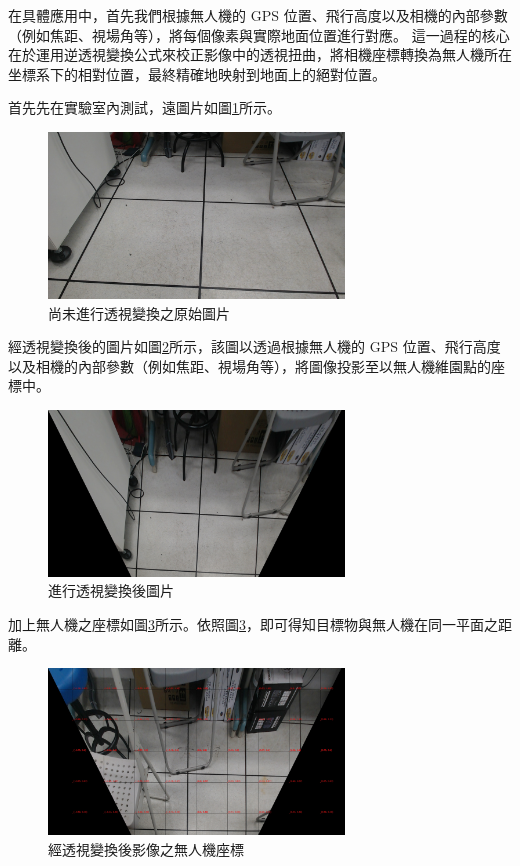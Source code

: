 \documentclass[12pt]{article}       %
\begin{document}
在具體應用中，首先我們根據無人機的 GPS 位置、飛行高度以及相機的內部參數（例如焦距、視場角等），將每個像素與實際地面位置進行對應。
這一過程的核心在於運用逆透視變換公式來校正影像中的透視扭曲，將相機座標轉換為無人機所在坐標系下的相對位置，最終精確地映射到地面上的絕對位置。

首先先在實驗室內測試，遠圖片如圖\ref{fig:11}所示。
\begin{figure}[H]
    \centering
    \includegraphics[width=0.7\textwidth]{11.jpg}     %
    \caption{尚未進行透視變換之原始圖片}    %
    \label{fig:11}    %
\end{figure}
經透視變換後的圖片如圖\ref{fig:33}所示，該圖以透過根據無人機的 GPS 位置、飛行高度以及相機的內部參數（例如焦距、視場角等），將圖像投影至以無人機維園點的座標中。
\begin{figure}[H]
    \centering
    \includegraphics[width=0.7\textwidth]{33.jpg}     %
    \caption{進行透視變換後圖片}    %
    \label{fig:33}    %
\end{figure}

加上無人機之座標如圖\ref{fig:22}所示。依照圖\ref{fig:22}，即可得知目標物與無人機在同一平面之距離。

\begin{figure}[H]
    \centering
    \includegraphics[width=0.7\textwidth]{22.jpg}     %
    \caption{經透視變換後影像之無人機座標}    %
    \label{fig:22}    %
\end{figure}
\end{document}
